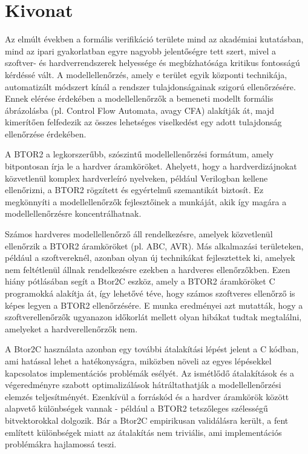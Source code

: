 \setcounter{page}{1}

\selecthungarian

\chapter*{Kivonat}

Az elmúlt években a formális verifikáció területe mind az akadémiai kutatásban, mind az ipari gyakorlatban egyre nagyobb jelentőségre tett szert, mivel a szoftver- és hardverrendszerek helyessége és megbízhatósága kritikus fontosságú kérdéssé vált. A modellellenőrzés, amely e terület egyik központi technikája, automatizált módszert kínál a rendszer tulajdonságainak szigorú ellenőrzésére. Ennek elérése érdekében a modellellenőrzők a bemeneti modellt formális ábrázolásba (pl. Control Flow Automata, avagy CFA) alakítják át, majd kimerítően felfedezik az összes lehetséges viselkedést egy adott tulajdonság ellenőrzése érdekében.  

A BTOR2 a legkorszerűbb, szószintű modellellenőrzési formátum, amely bitpontosan írja le a hardver áramköröket. Ahelyett, hogy a hardverdizájnokat közvetlenül komplex hardverleíró nyelveken, például Verilogban kellene ellenőrizni, a BTOR2 rögzített és egyértelmű szemantikát biztosít. Ez megkönnyíti a modellellenőrzők fejlesztőinek a munkáját, akik így magára a modellellenőrzésre koncentrálhatnak.  

Számos hardveres modellellenőrző áll rendelkezésre, amelyek közvetlenül ellenőrzik a BTOR2 áramköröket (pl. ABC, AVR). Más alkalmazási területeken, például a szoftvereknél, azonban olyan új technikákat fejlesztettek ki, amelyek nem feltétlenül állnak rendelkezésre ezekben a hardveres ellenőrzőkben. Ezen hiány pótlásában segít a Btor2C eszköz, amely a BTOR2 áramköröket C programokká alakítja át, így lehetővé téve, hogy számos szoftveres ellenőrző is képes legyen a BTOR2 ellenőrzésére. E munka eredményei azt mutatták, hogy a szoftverellenőrzők ugyanazon időkorlát mellett olyan hibákat tudtak megtalálni, amelyeket a hardverellenőrzők nem. 

A Btor2C használata azonban egy további átalakítási lépést jelent a C kódban, ami hatással lehet a hatékonyságra, miközben növeli az egyes lépésekkel kapcsolatos implementációs problémák esélyét. Az ismétlődő átalakítások és a végeredményre szabott optimalizálások hátráltathatják a modellellenőrzési elemzés teljesítményét. Ezenkívül a forráskód és a hardver áramkörök között alapvető különbségek vannak - például a BTOR2 tetszőleges szélességű bitvektorokkal dolgozik. Bár a Btor2C empirikusan validálásra került, a fent említett különbségek miatt az átalakítás nem triviális, ami implementációs problémákra hajlamossá teszi.  

